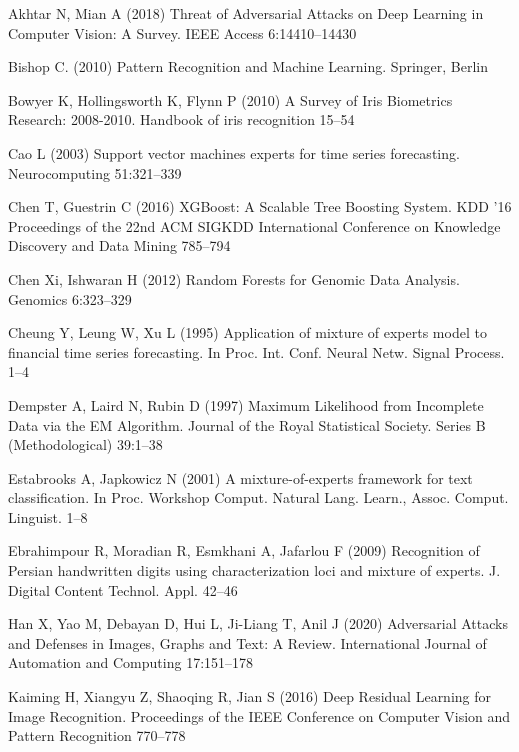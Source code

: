 \begin{thebibliography}{}
%
%
Akhtar N, Mian A (2018) Threat of Adversarial Attacks on Deep Learning in Computer Vision: A Survey. IEEE Access 6:14410--14430

Bishop C. (2010) Pattern Recognition and Machine Learning. Springer, Berlin 

Bowyer K, Hollingsworth K, Flynn P (2010) A Survey of Iris Biometrics Research: 2008-2010. Handbook of iris recognition 15--54

Cao L (2003) Support vector machines experts for time series forecasting. Neurocomputing 51:321--339

Chen T, Guestrin C (2016) XGBoost: A Scalable Tree Boosting System. KDD ’16 Proceedings of the 22nd ACM SIGKDD International Conference on Knowledge Discovery and Data Mining 785--794

Chen Xi, Ishwaran H (2012) Random Forests for Genomic Data Analysis. Genomics 6:323--329

Cheung Y, Leung W, Xu L (1995) Application of mixture of experts model to financial time series forecasting. In Proc. Int. Conf. Neural Netw. Signal Process. 1--4

Dempster A, Laird N, Rubin D (1997) Maximum Likelihood from Incomplete Data via the EM Algorithm. Journal of the Royal Statistical Society. Series B (Methodological) 39:1--38

Estabrooks A, Japkowicz N (2001) A mixture-of-experts framework for text classification. In Proc. Workshop Comput. Natural Lang. Learn., Assoc. Comput. Linguist. 1--8

Ebrahimpour R, Moradian R, Esmkhani A, Jafarlou F (2009) Recognition of Persian handwritten digits using characterization loci and mixture of experts. J. Digital Content Technol. Appl. 42--46

Han X, Yao M, Debayan D, Hui L, Ji-Liang T, Anil J (2020) Adversarial Attacks and Defenses in Images, Graphs and Text: A Review. International Journal of Automation and Computing 17:151--178

Kaiming H, Xiangyu Z, Shaoqing R, Jian S (2016) Deep Residual Learning for Image Recognition. Proceedings of the IEEE Conference on Computer Vision and Pattern Recognition 770--778


\end{thebibliography}
